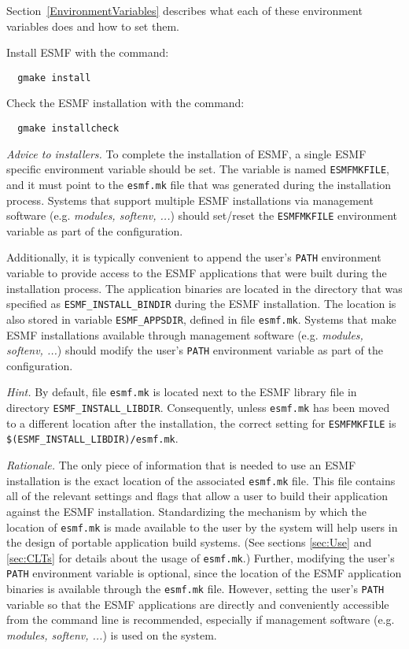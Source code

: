Section~\ref{EnvironmentVariables} describes what each of these
environment variables does and how to set them.

Install ESMF with the command:
\begin{verbatim}
  gmake install
\end{verbatim}

Check the ESMF installation with the command:
\begin{verbatim}
  gmake installcheck
\end{verbatim}

{\em Advice to installers.} To complete the installation of ESMF, a single ESMF specific environment variable should be set. The variable is named {\tt ESMFMKFILE}, and it must point to the {\tt esmf.mk} file that was generated during the installation process. Systems that support multiple ESMF installations via management software (e.g. {\em modules, softenv, ...}) should set/reset the {\tt ESMFMKFILE} environment variable as part of the configuration.

Additionally, it is typically convenient to append the user's {\tt PATH} environment variable to provide access to the ESMF applications that were built during the installation process. The application binaries are located in the directory that was specified as {\tt ESMF\_INSTALL\_BINDIR} during the ESMF installation. The location is also stored in variable {\tt ESMF\_APPSDIR}, defined in file {\tt esmf.mk}. Systems that make ESMF installations available through management software (e.g. {\em modules, softenv, ...}) should modify the user's {\tt PATH} environment variable as part of the configuration.

{\em Hint.} By default, file {\tt esmf.mk} is located next to the ESMF library file in  directory {\tt ESMF\_INSTALL\_LIBDIR}. Consequently, unless {\tt esmf.mk} has been moved to a different location after the installation, the correct setting for {\tt ESMFMKFILE} is {\tt \$(ESMF\_INSTALL\_LIBDIR)/esmf.mk}.

{\em Rationale.} The only piece of information that is needed to use an ESMF installation is the exact location of the associated {\tt esmf.mk} file. This file contains all of the relevant settings and flags that allow a user to build their application against the ESMF installation. Standardizing the mechanism by which the location of {\tt esmf.mk} is made available to the user by the system will help users in the design of portable application build systems. (See sections \ref{sec:Use} and \ref{sec:CLTs} for details about the usage of {\tt esmf.mk}.) Further, modifying the user's {\tt PATH} environment variable is optional, since the location of the ESMF application binaries is available through the {\tt esmf.mk} file. However, setting the user's {\tt PATH} variable so that the ESMF applications are directly and conveniently accessible from the command line is recommended, especially if management software (e.g. {\em modules, softenv, ...}) is used on the system.

